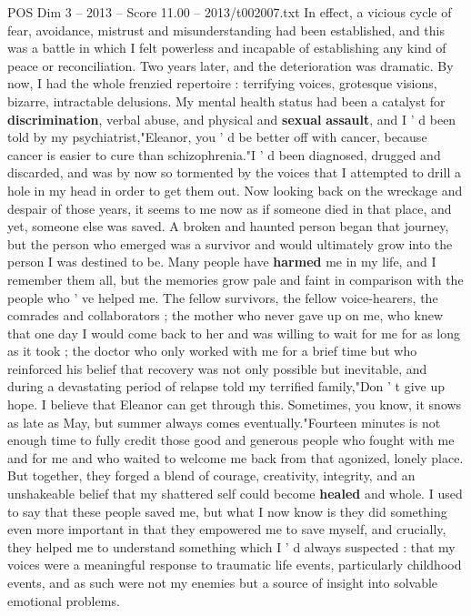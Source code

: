 \begin{textsample}{POS Dim 3 – 2013 – Score 11.00 – 2013/t002007.txt}
In effect, a vicious cycle of fear, avoidance, mistrust and misunderstanding had been established, and this was a battle in which I felt powerless and incapable of establishing any kind of peace or reconciliation.
Two years later, and the deterioration was dramatic.
By now, I had the whole frenzied repertoire : terrifying voices, grotesque visions, bizarre, intractable delusions.
My mental health status had been a catalyst for \textbf{discrimination}, verbal abuse, and physical and \textbf{sexual} \textbf{assault}, and I ' d been told by my psychiatrist,"Eleanor, you ' d be better off with cancer, because cancer is easier to cure than schizophrenia."I ' d been diagnosed, drugged and discarded, and was by now so tormented by the voices that I attempted to drill a hole in my head in order to get them out.
Now looking back on the wreckage and despair of those years, it seems to me now as if someone died in that place, and yet, someone else was saved.
A broken and haunted person began that journey, but the person who emerged was a survivor and would ultimately grow into the person I was destined to be.
Many people have \textbf{harmed} me in my life, and I remember them all, but the memories grow pale and faint in comparison with the people who ' ve helped me.
The fellow survivors, the fellow voice-hearers, the comrades and collaborators ; the mother who never gave up on me, who knew that one day I would come back to her and was willing to wait for me for as long as it took ; the doctor who only worked with me for a brief time but who reinforced his belief that recovery was not only possible but inevitable, and during a devastating period of relapse told my terrified family,"Don ' t give up hope.
I believe that Eleanor can get through this.
Sometimes, you know, it snows as late as May, but summer always comes eventually."Fourteen minutes is not enough time to fully credit those good and generous people who fought with me and for me and who waited to welcome me back from that agonized, lonely place.
But together, they forged a blend of courage, creativity, integrity, and an unshakeable belief that my shattered self could become \textbf{healed} and whole.
I used to say that these people saved me, but what I now know is they did something even more important in that they empowered me to save myself, and crucially, they helped me to understand something which I ' d always suspected : that my voices were a meaningful response to traumatic life events, particularly childhood events, and as such were not my enemies but a source of insight into solvable emotional problems.

\end{textsample}
